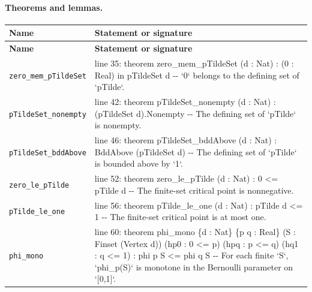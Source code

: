 \documentclass[10pt]{article}
\begin{document}
\paragraph{Theorems and lemmas.}
\begin{longtable}{>{\raggedright\arraybackslash}p{} >{\raggedright\arraybackslash}p{}}
\textbf{Name} & \textbf{Statement or signature} \\
\hline
\endfirsthead
\textbf{Name} & \textbf{Statement or signature} \\
\hline
\endhead
\texttt{zero\_\allowbreak{}mem\_\allowbreak{}pTildeSet} & {\ttfamily\scriptsize line 35:\allowbreak{} theorem zero\_\allowbreak{}mem\_\allowbreak{}pTildeSet (\allowbreak{}d :\allowbreak{} Nat)\allowbreak{} :\allowbreak{} (\allowbreak{}0 :\allowbreak{} Real)\allowbreak{} in pTildeSet d -\allowbreak{}-\allowbreak{} `0` belongs to the defining set of `pTilde`.\allowbreak{}} \\[0.45em]
\texttt{pTildeSet\_\allowbreak{}nonempty} & {\ttfamily\scriptsize line 42:\allowbreak{} theorem pTildeSet\_\allowbreak{}nonempty (\allowbreak{}d :\allowbreak{} Nat)\allowbreak{} :\allowbreak{} (\allowbreak{}pTildeSet d)\allowbreak{}.\allowbreak{}Nonempty -\allowbreak{}-\allowbreak{} The defining set of `pTilde` is nonempty.\allowbreak{}} \\[0.45em]
\texttt{pTildeSet\_\allowbreak{}bddAbove} & {\ttfamily\scriptsize line 46:\allowbreak{} theorem pTildeSet\_\allowbreak{}bddAbove (\allowbreak{}d :\allowbreak{} Nat)\allowbreak{} :\allowbreak{} BddAbove (\allowbreak{}pTildeSet d)\allowbreak{} -\allowbreak{}-\allowbreak{} The defining set of `pTilde` is bounded above by `1`.\allowbreak{}} \\[0.45em]
\texttt{zero\_\allowbreak{}le\_\allowbreak{}pTilde} & {\ttfamily\scriptsize line 52:\allowbreak{} theorem zero\_\allowbreak{}le\_\allowbreak{}pTilde (\allowbreak{}d :\allowbreak{} Nat)\allowbreak{} :\allowbreak{} 0 <=\allowbreak{} pTilde d -\allowbreak{}-\allowbreak{} The finite-\allowbreak{}set critical point is nonnegative.\allowbreak{}} \\[0.45em]
\texttt{pTilde\_\allowbreak{}le\_\allowbreak{}one} & {\ttfamily\scriptsize line 56:\allowbreak{} theorem pTilde\_\allowbreak{}le\_\allowbreak{}one (\allowbreak{}d :\allowbreak{} Nat)\allowbreak{} :\allowbreak{} pTilde d <=\allowbreak{} 1 -\allowbreak{}-\allowbreak{} The finite-\allowbreak{}set critical point is at most one.\allowbreak{}} \\[0.45em]
\texttt{phi\_\allowbreak{}mono} & {\ttfamily\scriptsize line 60:\allowbreak{} theorem phi\_\allowbreak{}mono \{d :\allowbreak{} Nat\} \{p q :\allowbreak{} Real\} (\allowbreak{}S :\allowbreak{} Finset (\allowbreak{}Vertex d)\allowbreak{})\allowbreak{} (\allowbreak{}hp0 :\allowbreak{} 0 <=\allowbreak{} p)\allowbreak{} (\allowbreak{}hpq :\allowbreak{} p <=\allowbreak{} q)\allowbreak{} (\allowbreak{}hq1 :\allowbreak{} q <=\allowbreak{} 1)\allowbreak{} :\allowbreak{} phi p S <=\allowbreak{} phi q S -\allowbreak{}-\allowbreak{} For each finite `S`,\allowbreak{} `phi\_\allowbreak{}p(\allowbreak{}S)\allowbreak{}` is monotone in the Bernoulli parameter on `[0,\allowbreak{}1]`.\allowbreak{}} \\[0.45em]

\end{longtable}
\end{document}

